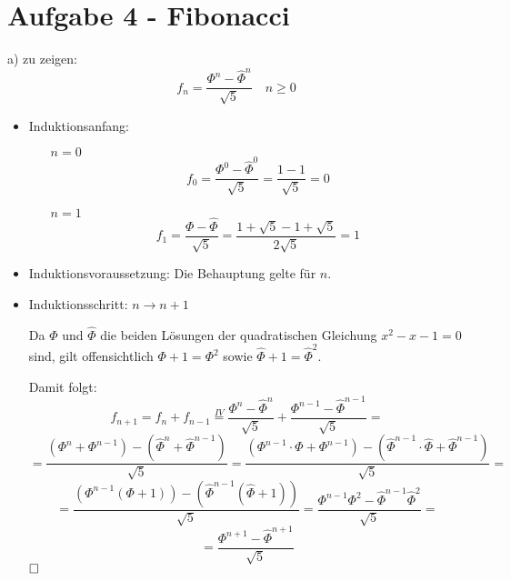 \section*{Aufgabe 4 - Fibonacci}
\begin{paragraph}{a)}
  zu zeigen:
  \[ f_n = \frac{\Phi^n - \hat \Phi^n}{\sqrt{5}} \quad n \geq 0 \]
  \begin{itemize}
    \item Induktionsanfang:
    \begin{itemize}
      \item[$n = 0$]
        \[ f_0 = \frac{\Phi^0 - \hat \Phi^0}{\sqrt{5}} 
               = \frac{1 - 1}{\sqrt{5}} = 0 \]
      \item[$n = 1$]
        \[ f_1 = \frac{\Phi - \hat \Phi}{\sqrt{5}} 
               = \frac{1 + \sqrt{5} - 1 + \sqrt{5}}{2 \sqrt{5}} = 1 \]
    \end{itemize}
    \item Induktionsvoraussetzung: Die Behauptung gelte für $n$.
    \item Induktionsschritt: $n \rightarrow n + 1$
    
    Da $\Phi$ und $\hat \Phi$ die beiden Lösungen der quadratischen Gleichung
    $x^2 - x - 1 = 0$ sind, gilt offensichtlich $\Phi + 1 = \Phi^2$ sowie
    $\hat \Phi + 1 = \hat \Phi^2$.
    
    Damit folgt:
    \[ f_{n+1} = f_n + f_{n-1} \overset{IV}{=} \frac{\Phi^n - \hat
       \Phi^n}{\sqrt{5}} + \frac{\Phi^{n-1} - \hat \Phi^{n-1}}{\sqrt{5}} = \]
    \[ = \frac{(\Phi^n + \Phi^{n-1}) - (\hat \Phi^n + \hat \Phi^{n-1})}{\sqrt{5}}
       = \frac{(\Phi^{n-1} \cdot \Phi + \Phi^{n-1}) - 
         (\hat \Phi^{n-1} \cdot \hat \Phi + \hat \Phi^{n-1})}{\sqrt{5}} = \]
    \[ = \frac{(\Phi^{n-1} (\Phi + 1)) - (\hat \Phi^{n-1} (\hat \Phi + 1))}{\sqrt{5}} 
       = \frac{\Phi^{n-1} \Phi^2 - \hat \Phi^{n-1} \hat \Phi^2}{\sqrt{5}} = \]
    \[ = \frac{\Phi^{n+1} - \hat \Phi^{n+1}}{\sqrt{5}} \]
    $\hfill \square$
  \end{itemize}
\end{paragraph}
